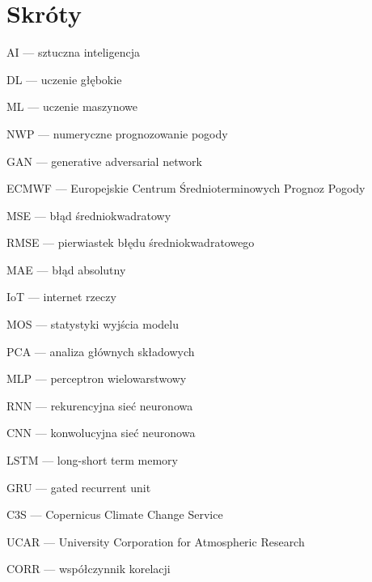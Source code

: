 \documentclass{article}
\begin{document}
\section*{Skróty}

\raggedright{}

AI — sztuczna inteligencja

DL — uczenie głębokie

ML — uczenie maszynowe

NWP — numeryczne prognozowanie pogody

GAN — generative adversarial network

ECMWF — Europejskie Centrum Średnioterminowych Prognoz Pogody

MSE — błąd średniokwadratowy

RMSE — pierwiastek błędu średniokwadratowego

MAE — błąd absolutny

IoT — internet rzeczy

MOS — statystyki wyjścia modelu

PCA — analiza głównych składowych

MLP — perceptron wielowarstwowy

RNN — rekurencyjna sieć neuronowa

CNN — konwolucyjna sieć neuronowa

LSTM — long-short term memory

GRU — gated recurrent unit

C3S — Copernicus Climate Change Service

UCAR — University Corporation for Atmospheric Research

CORR — współczynnik korelacji

\pagebreak
\printbibliography[title={Bibliografia}]
% 
\end{document}
